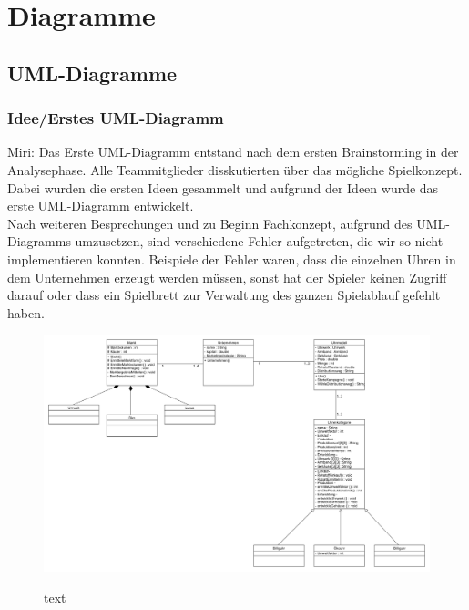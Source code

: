 \clearpage
\chapter{Diagramme}
\section{UML-Diagramme}
\subsection{Idee/Erstes UML-Diagramm}
Miri: Das Erste UML-Diagramm entstand nach dem ersten Brainstorming in der Analysephase. Alle Teammitglieder disskutierten über das mögliche Spielkonzept. Dabei wurden die ersten Ideen gesammelt und aufgrund der Ideen wurde das erste UML-Diagramm entwickelt. \\
Nach weiteren Besprechungen und zu Beginn Fachkonzept, aufgrund des UML-Diagramms umzusetzen, sind verschiedene Fehler aufgetreten, die wir so nicht implementieren konnten. 
Beispiele der Fehler waren, dass die einzelnen Uhren in dem Unternehmen erzeugt werden müssen, sonst hat der Spieler keinen Zugriff darauf oder dass ein Spielbrett zur Verwaltung des ganzen Spielablauf gefehlt haben.

\begin{figure} [h]
	\centering
	\includegraphics[scale=0.25, angle=90]{img/ErsterEntwurfUML.png} 
	\label{key}
	\caption{text}
\end{figure}
\clearpage
